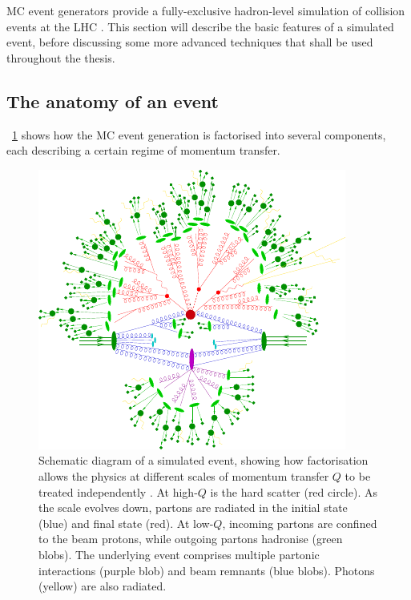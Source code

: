 
\ac{MC} event generators provide a fully-exclusive hadron-level simulation of \pp 
collision events at the \acs{LHC} \cite{MCnet:general}. This section will describe the 
basic features of a simulated event, before discussing some more advanced techniques 
that shall be used throughout the thesis.



\subsection{The anatomy of an event}

\Figure~\ref{fig:mcevent} shows how the \ac{MC} event generation is factorised into 
several components, each describing a certain regime of momentum transfer.

\begin{figure}[t]
	\includegraphics[width=\largefigwidth]{tex/tools/event}
	\caption{Schematic diagram of a simulated \ttH event, showing how factorisation allows 
	the physics at different scales of momentum transfer $Q$ to be treated independently 
	\cite{MCnet:MatchingLectures}.
	At high-$Q$ is the hard scatter (red circle). As the scale evolves down, partons are 
	radiated in the initial state (blue) and final state (red). At low-$Q$, incoming 
	partons are confined to the beam protons, while outgoing partons hadronise (green 
	blobs). The underlying event comprises multiple partonic interactions (purple blob) 
	and beam remnants (blue blobs). Photons (yellow) are also radiated.}
	\label{fig:mcevent}
\end{figure}

